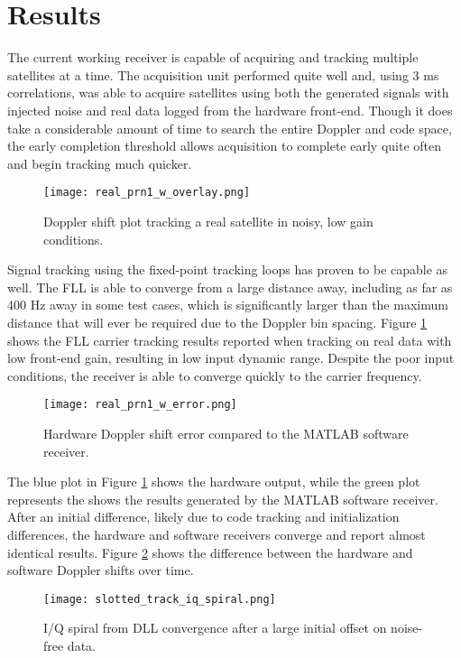 \documentclass[12pt]{article}
\begin{document}
\section{Results}
The current working receiver is capable of acquiring and tracking multiple satellites at a time. The acquisition unit performed quite well and, using 3 ms correlations, was able to acquire satellites using both the generated signals with injected noise and real data logged from the hardware front-end. Though it does take a considerable amount of time to search the entire Doppler and code space, the early completion threshold allows acquisition to complete early quite often and begin tracking much quicker.

\begin{figure}
\centering
\texttt{[image: real\_prn1\_w\_overlay.png]}
\caption{Doppler shift plot tracking a real satellite in noisy, low gain conditions.}
\label{img:prn1 doppler}
\end{figure}

Signal tracking using the fixed-point tracking loops has proven to be capable as well. The FLL is able to converge from a large distance away, including as far as 400 Hz away in some test cases, which is significantly larger than the maximum distance that will ever be required due to the Doppler bin spacing. Figure \ref{img:prn1 doppler} shows the FLL carrier tracking results reported when tracking on real data with low front-end gain, resulting in low input dynamic range. Despite the poor input conditions, the receiver is able to converge quickly to the carrier frequency.

\begin{figure}
\centering
\texttt{[image: real\_prn1\_w\_error.png]}
\caption{Hardware Doppler shift error compared to the MATLAB software receiver.}
\label{img:prn1 doppler error}
\end{figure}

The blue plot in Figure \ref{img:prn1 doppler} shows the hardware output, while the green plot represents the shows the results generated by the MATLAB software receiver. After an initial difference, likely due to code tracking and initialization differences, the hardware and software receivers converge and report almost identical results. Figure \ref{img:prn1 doppler error} shows the difference between the hardware and software Doppler shifts over time.

\begin{figure}
\centering
\texttt{[image: slotted\_track\_iq\_spiral.png]}
\caption{I/Q spiral from DLL convergence after a large initial offset on noise-free data.}
\label{img:iq spiral}
\end{figure}
\end{document}
